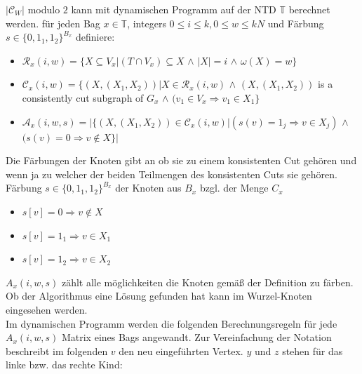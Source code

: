 $|\mathcal{C}_W|$ modulo $2$ kann mit dynamischen Programm auf der NTD $\mathbb{T}$ berechnet werden.
für jeden Bag $x \in \mathbb{T}$, integers $0 \leq i \leq k,0 \leq w \leq kN$ und Färbung $s \in \{0,1_1,1_2 \}^{B_x}$ definiere:
\begin{itemize}
\item $\mathcal{R}_x(i,w)=\{X \subseteq V_x | (T \cap V_x) \subseteq X$ $\wedge$ $|X| = i$ $\wedge$ $\omega (X) = w \}$
\item $\mathcal{C}_x (i,w) =\{ (X,(X_1,X_2)) | X \in \mathcal{R}_x(i,w)$ $\wedge$ $(X,(X_1,X_2))$ is a consistently cut subgraph of $G_x$ $\wedge$ $(v_1 \in V_x \Rightarrow v_1 \in X_1 \} $
\item $\mathcal{A}_x(i,w,s)=| \{ (X,(X_1,X_2)) \in \mathcal{C}_x(i,w) | (s(v) = 1_j \Rightarrow v \in X_j)$ $\wedge$ $(s(v)=0 \Rightarrow v \notin X \} |$
\end{itemize}
Die Färbungen der Knoten gibt an ob sie zu einem konsistenten Cut gehören und wenn ja zu welcher der beiden Teilmengen des konsistenten Cuts sie gehören.
Färbung $s \in \{0,1_1,1_2 \}^{B_x}$  der Knoten aus $B_x$ bzgl. der Menge $C_x$
\begin{itemize}
\item $s[v] = 0 \Rightarrow v \notin X$
\item $s[v] = 1_1 \Rightarrow v \in X_1$ 
\item $s[v] = 1_2 \Rightarrow v \in X_2$ 
\end{itemize}
$A_x(i,w,s)$ zählt alle möglichkeiten die Knoten gemäß der Definition zu färben.
Ob der Algorithmus eine Lösung gefunden hat kann im Wurzel-Knoten eingesehen werden.\\
Im dynamischen Programm werden die folgenden Berechnungsregeln für jede $A_x(i,w,s)$ Matrix eines Bags angewandt. Zur Vereinfachung der Notation beschreibt im folgenden $v$ den neu eingeführten Vertex. $y$ und $z$ stehen für das linke bzw. das rechte Kind:
